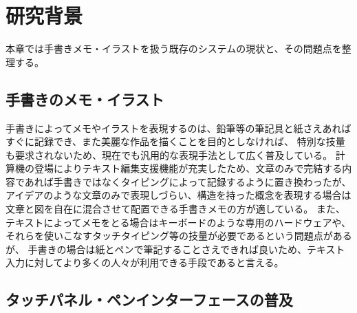 \chapter{研究背景}
\label{chap:haikei}

本章では手書きメモ・イラストを扱う既存のシステムの現状と、その問題点を整理する。

\newpage

\section{手書きのメモ・イラスト}
手書きによってメモやイラストを表現するのは、鉛筆等の筆記具と紙さえあればすぐに記録でき、また美麗な作品を描くことを目的としなければ、
特別な技量も要求されないため、現在でも汎用的な表現手法として広く普及している。
計算機の登場によりテキスト編集支援機能が充実したため、文章のみで完結する内容であれば手書きではなくタイピングによって記録するように置き換わったが、
アイデアのような文章のみで表現しづらい、構造を持った概念を表現する場合は文章と図を自在に混合させて配置できる手書きメモの方が適している。
また、テキストによってメモをとる場合はキーボードのような専用のハードウェアや、それらを使いこなすタッチタイピング等の技量が必要であるという問題点があるが、
手書きの場合は紙とペンで筆記することさえできれば良いため、テキスト入力に対してより多くの人々が利用できる手段であると言える。

\section{タッチパネル・ペンインターフェースの普及}
